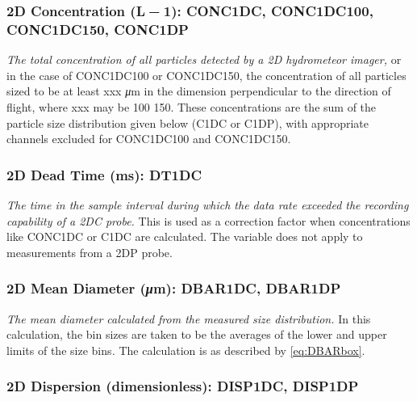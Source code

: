 \documentclass[
]{book}
\begin{document}
\hypertarget{conc2d}{%
\subsubsection*{\texorpdfstring{2D Concentration (L{ − 1}): CONC1DC, CONC1DC100, CONC1DC150, CONC1DP}{2D Concentration (L − 1): CONC1DC, CONC1DC100, CONC1DC150, CONC1DP}}\label{conc2d}}

\emph{The total concentration of all particles detected by a 2D hydrometeor imager,} or in the case of CONC1DC100 or CONC1DC150, the concentration of all particles sized to be at least xxx {\emph{μ}}m in the dimension perpendicular to the direction of flight, where xxx may be 100 150. These concentrations are the sum of the particle size distribution given below (C1DC or C1DP), with appropriate channels excluded for CONC1DC100 and CONC1DC150.

\hypertarget{dt1dc}{%
\subsubsection*{2D Dead Time (ms): DT1DC}\label{dt1dc}}

\emph{The time in the sample interval during which the data rate exceeded the recording capability of a 2DC probe.} This is used as a correction factor when concentrations like CONC1DC or C1DC are calculated. The variable does not apply to measurements from a 2DP probe.

\hypertarget{dbar2d}{%
\subsubsection*{\texorpdfstring{2D Mean Diameter ({\emph{μ}}m): DBAR1DC, DBAR1DP}{2D Mean Diameter (μm): DBAR1DC, DBAR1DP}}\label{dbar2d}}

\emph{The mean diameter calculated from the measured size distribution.} In this calculation, the bin sizes are taken to be the averages of the lower and upper limits of the size bins\emph{.} The calculation is as described by \eqref{eq:DBARbox}.

\hypertarget{disp2d}{%
\subsubsection*{2D Dispersion (dimensionless): DISP1DC, DISP1DP}\label{disp2d}}
\end{document}
